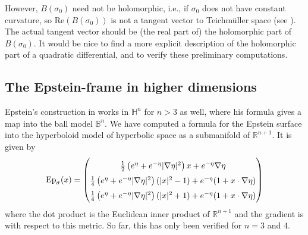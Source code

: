 \documentclass[11pt]{amsart}
\newcommand{\R}{\mathbb{R}}
\renewcommand{\H}{\mathbb{H}}
\begin{document}
However, $B(\sigma_0)$ need not be holomorphic, i.e., if $\sigma_0$ does not have constant curvature, so $\mathrm{Re}(B(\sigma_0))$ is not a tangent vector to Teichm\"uller space (see \cite{tromba1992}). The actual tangent vector should be (the real part of) the holomorphic part of $B(\sigma_0)$. 
It would be nice to find a more explicit description of the holomorphic part of a quadratic differential, and to verify these preliminary computations.

\subsection{The Epstein-frame in higher dimensions}
\label{higher-dims}


Epstein's construction in \cite{epstein1984} works in $\H^n$ for $n > 3$ as well, where his formula gives a map into the ball model $\mathbb{B}^n$.
We have computed a formula for the Epstein surface into the hyperboloid model of hyperbolic space as a submanifold of $\R^{n+1}$.
It is given by 
\[
\mathrm{Ep}_\sigma(x) = 
\def\arraystretch{1.5}
\begin{pmatrix}
\frac{1}{2}\left( e^\eta + e^{-\eta} | \nabla \eta |^2 \right)x + e^{-\eta} \nabla \eta \\
\frac{1}{4} \left(e^\eta + e^{-\eta} | \nabla \eta |^2 \right)( | x |^2 - 1) + e^{-\eta}(1 + x \cdot \nabla\eta) \\
\frac{1}{4} \left(e^\eta + e^{-\eta} | \nabla \eta |^2 \right)( | x |^2 + 1) + e^{-\eta}(1 + x \cdot \nabla\eta)
\end{pmatrix}
\]
where the dot product is the Euclidean inner product of $\R^{n+1}$ and the gradient is with respect to this metric.
So far, this has only been verified for $n = 3$ and 4.
\end{document}
